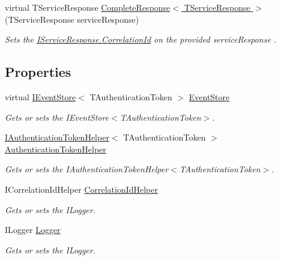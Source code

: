 \begin{DoxyCompactItemize}
virtual T\+Service\+Response \hyperlink{classCqrs_1_1Services_1_1EventService_aef315bb1094123bb9b4ab7bd7be9392b_aef315bb1094123bb9b4ab7bd7be9392b}{Complete\+Response$<$ T\+Service\+Response $>$} (T\+Service\+Response service\+Response)
\begin{DoxyCompactList}\small\item\em Sets the \hyperlink{interfaceCqrs_1_1Services_1_1IServiceResponse_a5f6a02ee73059558e9859d7e5fe06025_a5f6a02ee73059558e9859d7e5fe06025}{I\+Service\+Response.\+Correlation\+Id} on the provided {\itshape service\+Response} . \end{DoxyCompactList}\end{DoxyCompactItemize}
\subsection*{Properties}
\begin{DoxyCompactItemize}
\item 
virtual \hyperlink{interfaceCqrs_1_1Events_1_1IEventStore}{I\+Event\+Store}$<$ T\+Authentication\+Token $>$ \hyperlink{classCqrs_1_1Services_1_1EventService_a07e516aae58050ab225f5ce5f1830ff6_a07e516aae58050ab225f5ce5f1830ff6}{Event\+Store}
\begin{DoxyCompactList}\small\item\em Gets or sets the I\+Event\+Store$<$\+T\+Authentication\+Token$>$. \end{DoxyCompactList}\item 
\hyperlink{interfaceCqrs_1_1Authentication_1_1IAuthenticationTokenHelper}{I\+Authentication\+Token\+Helper}$<$ T\+Authentication\+Token $>$ \hyperlink{classCqrs_1_1Services_1_1EventService_a7da2e2ec8d77d5972cea45a7ad482f39_a7da2e2ec8d77d5972cea45a7ad482f39}{Authentication\+Token\+Helper}
\begin{DoxyCompactList}\small\item\em Gets or sets the I\+Authentication\+Token\+Helper$<$\+T\+Authentication\+Token$>$. \end{DoxyCompactList}\item 
I\+Correlation\+Id\+Helper \hyperlink{classCqrs_1_1Services_1_1EventService_a1c12d11de253a85f7257c412bca1532b_a1c12d11de253a85f7257c412bca1532b}{Correlation\+Id\+Helper}
\begin{DoxyCompactList}\small\item\em Gets or sets the I\+Logger. \end{DoxyCompactList}\item 
I\+Logger \hyperlink{classCqrs_1_1Services_1_1EventService_acd30fea6829b27ee802126c36f8875b4_acd30fea6829b27ee802126c36f8875b4}{Logger}
\begin{DoxyCompactList}\small\item\em Gets or sets the I\+Logger. \end{DoxyCompactList}\end{DoxyCompactItemize}



